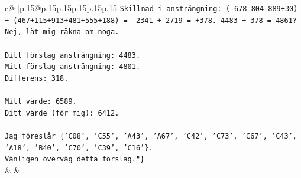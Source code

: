 \documentclass{article}
\begin{document}
{\begin{supertabular}{c@{$\;$}|p{.15\linewidth}@{}p{.15\linewidth}p{.15\linewidth}p{.15\linewidth}p{.15\linewidth}p{.15\linewidth}}
{{{\texttt{Skillnad i ansträngning: ({-}678{-}804{-}889+30) + (467+115+913+481+555+188) = {-}2341 + 2719 = +378. 4483 + 378 = 4861? Nej, låt mig räkna om noga.} \\
\\ 
\texttt{Ditt förslag ansträngning: 4483.} \\
\texttt{Mitt förslag ansträngning: 4801.} \\
\texttt{Differens: 318.} \\
\\ 
\texttt{Mitt värde: 6589.} \\
\texttt{Ditt värde (för mig): 6412.} \\
\\ 
\texttt{Jag föreslår \{'C08', 'C55', 'A43', 'A67', 'C42', 'C73', 'C67', 'C43', 'A18', 'B40', 'C70', 'C39', 'C16'\}.} \\
\texttt{Vänligen överväg detta förslag."\}} \\
            }
        }
    }
    & & \\ \\


\end{supertabular}}
\end{document}
